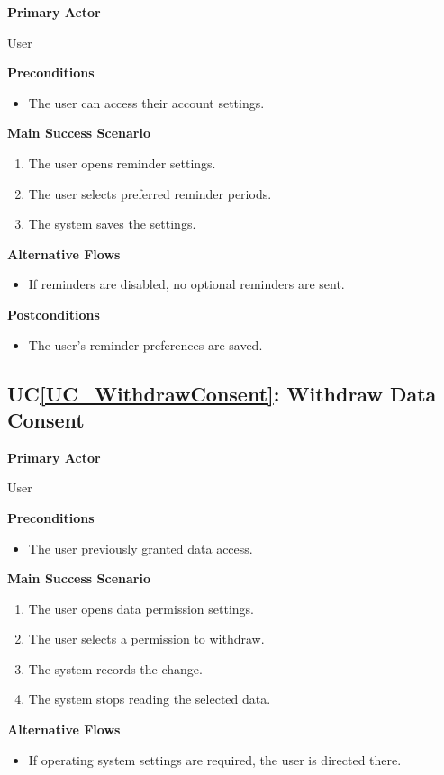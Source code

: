 \documentclass[12pt]{article}
\newcounter{ucnum} %
\newcommand{\ucref}[1]{UC\ref{#1}}
\begin{document}
\textbf{Primary Actor}

User

\textbf{Preconditions}
\begin{itemize}
\item The user can access their account settings.
\end{itemize}

\textbf{Main Success Scenario}
\begin{enumerate}
\item The user opens reminder settings.
\item The user selects preferred reminder periods.
\item The system saves the settings.
\end{enumerate}

\textbf{Alternative Flows}
\begin{itemize}
\item If reminders are disabled, no optional reminders are sent.
\end{itemize}

\textbf{Postconditions}
\begin{itemize}
\item The user's reminder preferences are saved.
\end{itemize}


\label{UC_WithdrawConsent}
\subsection{\ucref{UC_WithdrawConsent}: Withdraw Data Consent}

\textbf{Primary Actor}

User

\textbf{Preconditions}
\begin{itemize}
\item The user previously granted data access.
\end{itemize}

\textbf{Main Success Scenario}
\begin{enumerate}
\item The user opens data permission settings.
\item The user selects a permission to withdraw.
\item The system records the change.
\item The system stops reading the selected data.
\end{enumerate}

\textbf{Alternative Flows}
\begin{itemize}
\item If operating system settings are required, the user is directed there.
\end{itemize}
\end{document}
